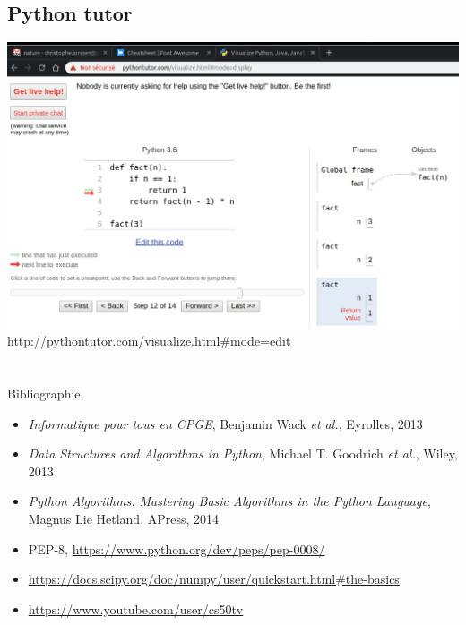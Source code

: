 \documentclass[10pt,aspectratio=169]{beamer}
\makeatletter
\def\beamer@writeslidentry@miniframesoff{%
  \expandafter\beamer@ifempty\expandafter{\beamer@framestartpage}{}%
  {%
    \clearpage\beamer@notesactions%
  }
}
\newcommand*{\miniframesoff}{\let\beamer@writeslidentry=\beamer@writeslidentry@miniframesoff}
\makeatother
\begin{document}
\subsection{Python tutor}

\begin{frame}
  \begin{center}
    \includegraphics[height = .7\textheight]{python-tutor-fact}
    \url{http://pythontutor.com/visualize.html\#mode=edit}
  \end{center}  
\end{frame}

\miniframesoff

\section{}

\begin{frame}{Bibliographie}
  \begin{itemize}
  \item \emph{Informatique pour tous en CPGE}, Benjamin Wack \emph{et al.}, Eyrolles, 2013
  \item \emph{Data Structures and Algorithms in Python}, Michael T. Goodrich \emph{et al.}, Wiley, 2013
  \item \emph{Python Algorithms: Mastering Basic Algorithms in the Python Language}, Magnus Lie Hetland, APress, 2014
  \item PEP-8, \url{https://www.python.org/dev/peps/pep-0008/}
  \item \url{https://docs.scipy.org/doc/numpy/user/quickstart.html\#the-basics}
  \item \url{https://www.youtube.com/user/cs50tv}
  \end{itemize}
\end{frame}
\end{document}

